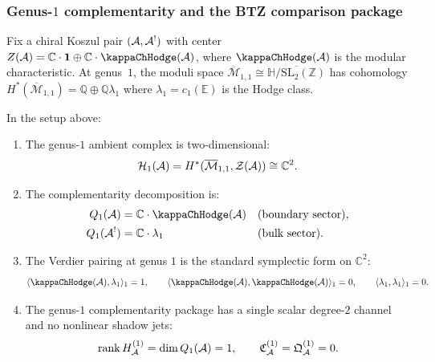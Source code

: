 \subsubsection{Genus-$1$ complementarity and the BTZ
comparison package}

\begin{setup}
Fix a chiral Koszul pair $(\mathcal{A}, \mathcal{A}^!)$ with center
$Z(\cA) = \mathbb{C} \cdot \mathbf{1} \oplus
\mathbb{C} \cdot \kappaChHodge(\cA)$, where $\kappaChHodge(\cA)$ is the
modular characteristic.
At genus~$1$, the moduli space
$\overline{\mathcal{M}}_{1,1} \cong \overline{\mathbb{H}/\mathrm{SL}_2(\mathbb{Z})}$
has cohomology
$H^*(\overline{\mathcal{M}}_{1,1})
= \mathbb{Q} \oplus \mathbb{Q}\lambda_1$
where $\lambda_1 = c_1(\mathbb{E})$ is the Hodge class.
\end{setup}

\begin{theorem}
In the setup above:
\begin{enumerate}[label=\textup{(\roman*)}]
\item The genus-$1$ ambient complex is two-dimensional:
 \begin{equation}%
 \mathcal{H}_1(\cA)
 = H^*(\overline{\mathcal{M}}_{1,1}, \mathcal{Z}(\cA))
 \cong \mathbb{C}^2.
 \end{equation}

\item The complementarity decomposition is:
 \begin{align}
 Q_1(\cA) &= \mathbb{C} \cdot \kappaChHodge(\cA)
 &&\text{\textup{(}boundary sector\textup{)}},
 \\
 Q_1(\cA^!) &= \mathbb{C} \cdot \lambda_1
 &&\text{\textup{(}bulk sector\textup{)}}.
 \end{align}

\item The Verdier pairing at genus $1$ is the standard
 symplectic form on $\mathbb{C}^2$:
 \begin{equation}%
 \langle \kappaChHodge(\cA), \lambda_1 \rangle_1 = 1,
 \qquad
 \langle \kappaChHodge(\cA), \kappaChHodge(\cA) \rangle_1 = 0,
 \qquad
 \langle \lambda_1, \lambda_1 \rangle_1 = 0.
 \end{equation}

\item The genus-$1$ complementarity package has a single scalar
 degree-$2$ channel and no nonlinear shadow jets:
 \begin{equation}%
 \rank H_\cA^{(1)} = \dim Q_1(\cA)=1,
 \qquad
 \mathfrak{C}_\cA^{(1)}=\mathfrak{Q}_\cA^{(1)}=0.
 \end{equation}
\end{enumerate}
\end{theorem}

